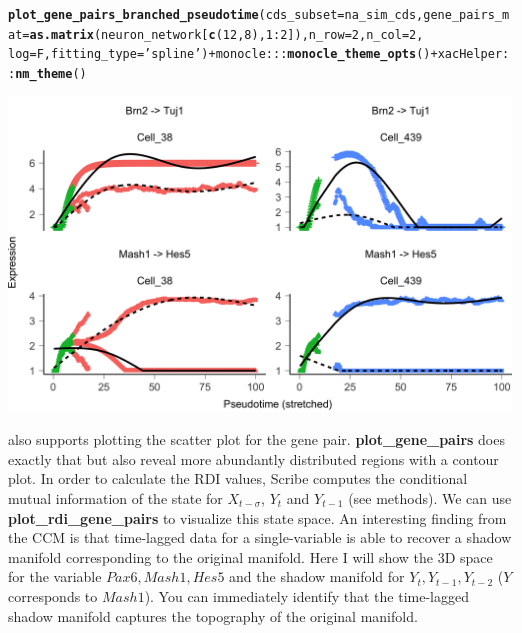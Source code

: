 \documentclass[10pt,oneside]{article}\usepackage[]{graphicx}\usepackage[]{color}
\makeatletter
\def\maxwidth{ %
  \ifdim\Gin@nat@width>\linewidth
    \linewidth
  \else
    \Gin@nat@width
  \fi
}
\newcommand{\hlnum}[1]{\textcolor[rgb]{0.686,0.059,0.569}{#1}}%
\newcommand{\hlstr}[1]{\textcolor[rgb]{0.192,0.494,0.8}{#1}}%
\newcommand{\hlopt}[1]{\textcolor[rgb]{0,0,0}{#1}}%
\newcommand{\hlstd}[1]{\textcolor[rgb]{0.345,0.345,0.345}{#1}}%
\newcommand{\hlkwc}[1]{\textcolor[rgb]{0.333,0.667,0.333}{#1}}%
\newcommand{\hlkwd}[1]{\textcolor[rgb]{0.737,0.353,0.396}{\textbf{#1}}}%
\newenvironment{kframe}{%
 \def\at@end@of@kframe{}%
 \ifinner\ifhmode%
  \def\at@end@of@kframe{\end{minipage}}%
  \begin{minipage}{\columnwidth}%
 \fi\fi%
 \def\FrameCommand##1{\hskip\@totalleftmargin \hskip-\fboxsep
 \colorbox{shadecolor}{##1}\hskip-\fboxsep
     \hskip-\linewidth \hskip-\@totalleftmargin \hskip\columnwidth}%
 \MakeFramed {\advance\hsize-\width
   \@totalleftmargin\z@ \linewidth\hsize
   \@setminipage}}%
 {\par\unskip\endMakeFramed%
 \at@end@of@kframe}
\newenvironment{knitrout}{}{} %
\makeatother
\begin{document}
\begin{knitrout}
{}


\begin{kframe}\begin{alltt}
\hlkwd{plot_gene_pairs_branched_pseudotime}\hlstd{(}\hlkwc{cds_subset} \hlstd{= na_sim_cds,} \hlkwc{gene_pairs_mat} \hlstd{=} \hlkwd{as.matrix}\hlstd{(neuron_network[}\hlkwd{c}\hlstd{(}\hlnum{12}\hlstd{,} \hlnum{8}\hlstd{),} \hlnum{1}\hlopt{:}\hlnum{2}\hlstd{]),} \hlkwc{n_row} \hlstd{=} \hlnum{2}\hlstd{,} \hlkwc{n_col} \hlstd{=} \hlnum{2}\hlstd{,}
                                    \hlkwc{log} \hlstd{= F,} \hlkwc{fitting_type} \hlstd{=} \hlstr{'spline'}\hlstd{)} \hlopt{+} \hlstd{monocle}\hlopt{:::}\hlkwd{monocle_theme_opts}\hlstd{()} \hlopt{+} \hlstd{xacHelper}\hlopt{::}\hlkwd{nm_theme}\hlstd{()}
\end{alltt}
\end{kframe}

{\centering \includegraphics[width=\maxwidth]{figure/gene_pairwise_kinetic_plot-2} 

}



\end{knitrout}

 also supports plotting the scatter plot for the gene pair. \textbf{plot\_gene\_pairs} does exactly that but also reveal more abundantly distributed regions with a contour plot. In order to calculate the RDI values, Scribe computes the conditional mutual information of the state for $X_{t - \sigma}$, $Y_t$ and $Y_{t - 1}$ (see methods). We can use \textbf{plot\_rdi\_gene\_pairs} to visualize this state space. An interesting finding from the CCM is that time-lagged data for a single-variable is able to recover a shadow manifold corresponding to the original manifold. Here I will show the 3D space for the variable $Pax6, Mash1, Hes5$ and the shadow manifold for $Y_t, Y_{t - 1}, Y_{t - 2}$ ($Y$ corresponds to $Mash1$). You can immediately identify that the time-lagged shadow manifold captures the topography of the original manifold.
\end{document}
